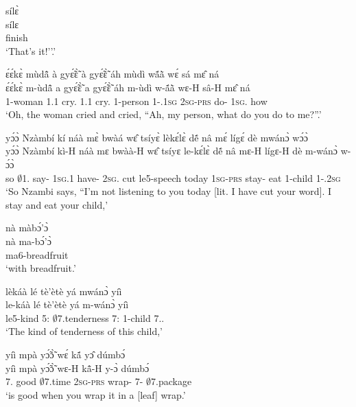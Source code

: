 \begin{exe}[(N234)]
\exN\label{n70}
  \glll sílɛ̀ \\
        sílɛ \\
         finish   \\
    \trans `That's it!''.'
 
\exN\label{n71}
  \glll  ɛ́ɛ́kɛ̀ mùdã̂ à gyɛ̃́ɛ̃̀ à gyɛ̃́ɛ̃̀ áh mùdì wã́ã̀ wɛ́ sá mɛ̂ ná \\
        ɛ́ɛ́kɛ̀ m-ùdã̂ a gyɛ̃́ɛ̃̀ a gyɛ̃́ɛ̃̀ áh m-ùdì w-ã́ã̀ wɛ-H sâ-H mɛ̂ ná \\
          {\EXCL} {\N}1-woman 1.{\PST}1 cry.{\COMPL} 1.{\PST}1 cry.{\COMPL} {\EXCL} {\N}1-person 1-{\POSS}.1\textsc{sg} 2\textsc{sg}-\textsc{prs} do-{\R} 1\textsc{sg}.{\OBJ} how \\
    \trans `Oh, the woman cried and cried, ``Ah, my person, what do you do to me?''.'
 
\exN\label{n72}
  \glll  yɔ́ɔ̀ Nzàmbí kí náà mɛ̀ bwàá wɛ̂ tsíyɛ̀ lèkɛ́lɛ̀ dẽ́ nâ mɛ́ lígɛ́ dè mwánɔ̀ wɔ́ɔ̀ \\
       yɔ́ɔ̀ Nzàmbí kì-H náà mɛ bwàà-H wɛ̂ tsíyɛ le-kɛ́lɛ̀ dẽ́ nâ mɛ-H lígɛ-H dè m-wánɔ̀ w-ɔ́ɔ̀ \\
         so $\emptyset$1.{\PN} say-{\R} {\COMP} 1\textsc{sg}.{\PST}1 have-{\R} 2\textsc{sg}.{\OBJ} cut le5-speech today {\COMP} 1\textsc{sg}-\textsc{prs} stay-{\R} eat {\N}1-child 1-{\POSS}.2\textsc{sg}\\
    \trans `So Nzambi says, ``I'm not listening to you today [lit. I have cut your word]. I stay and eat your child,'
 
\exN\label{n73}
  \glll nà màbɔ́'ɔ̀ \\
        nà ma-bɔ́'ɔ̀ \\
        {\COM} ma6-breadfruit\\
    \trans `with breadfruit.'
 
\exN\label{n74}
  \glll lèkáà lé tè'ètè yá mwánɔ̀ yíì \\
          le-káà lé tè'ètè yá m-wánɔ̀ yíì \\
          le5-kind 5:{\ATT}  $\emptyset$7.tenderness 7:{\ATT}  {\N}1-child 7.{\DEM}.{\PROX}  \\
    \trans `The kind of tenderness of this child,'
 
\exN\label{n75}
  \glll yíì mpà yɔ̃́ɔ̃̀ wɛ́ kã́ yɔ̂ dúmbɔ́ \\
       yíì mpà yɔ̃́ɔ̃̀ wɛ-H kã̂-H y-ɔ̀ dúmbɔ́ \\
         7.{\COP} good $\emptyset$7.time 2\textsc{sg}-\textsc{prs} wrap-{\R} 7-{\OBJ} $\emptyset$7.package\\ 
    \trans `is good when you wrap it in a [leaf] wrap.'
 

\end{exe}
